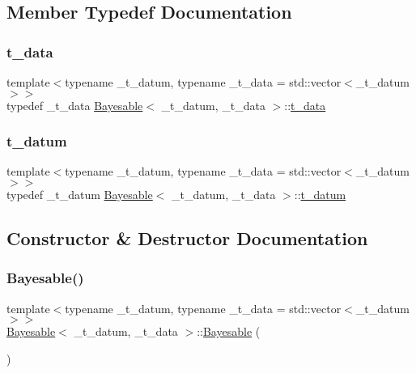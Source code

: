 \subsection{Member Typedef Documentation}
\mbox{\label{class_bayesable_a70a593a67c7d43239ecc06bb4fd06a6b}} 
\subsubsection{\texorpdfstring{t\+\_\+data}{t\_data}}
{\footnotesize\ttfamily template$<$typename \+\_\+t\+\_\+datum, typename \+\_\+t\+\_\+data = std\+::vector$<$\+\_\+t\+\_\+datum$>$$>$ \\
typedef \+\_\+t\+\_\+data \hyperlink{class_bayesable}{Bayesable}$<$ \+\_\+t\+\_\+datum, \+\_\+t\+\_\+data $>$\+::\hyperlink{class_bayesable_a70a593a67c7d43239ecc06bb4fd06a6b}{t\+\_\+data}}

\mbox{\label{class_bayesable_a7c93a2eeab708378eb321745908718d4}} 
\subsubsection{\texorpdfstring{t\+\_\+datum}{t\_datum}}
{\footnotesize\ttfamily template$<$typename \+\_\+t\+\_\+datum, typename \+\_\+t\+\_\+data = std\+::vector$<$\+\_\+t\+\_\+datum$>$$>$ \\
typedef \+\_\+t\+\_\+datum \hyperlink{class_bayesable}{Bayesable}$<$ \+\_\+t\+\_\+datum, \+\_\+t\+\_\+data $>$\+::\hyperlink{class_bayesable_a7c93a2eeab708378eb321745908718d4}{t\+\_\+datum}}



\subsection{Constructor \& Destructor Documentation}
\mbox{\label{class_bayesable_ab011f9e26a5c6e742d1239e7569df9eb}} 
\subsubsection{\texorpdfstring{Bayesable()}{Bayesable()}}
{\footnotesize\ttfamily template$<$typename \+\_\+t\+\_\+datum, typename \+\_\+t\+\_\+data = std\+::vector$<$\+\_\+t\+\_\+datum$>$$>$ \\
\hyperlink{class_bayesable}{Bayesable}$<$ \+\_\+t\+\_\+datum, \+\_\+t\+\_\+data $>$\+::\hyperlink{class_bayesable}{Bayesable} (\begin{DoxyParamCaption}{ }\end{DoxyParamCaption})\hspace{0.3cm}{\ttfamily [inline]}}



